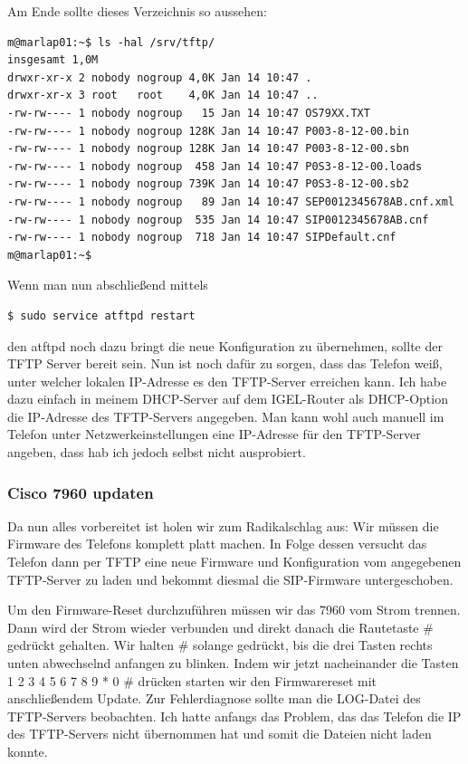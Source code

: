 \documentclass[a4paper,12pt]{scrbook}
\begin{document}
Am Ende sollte dieses Verzeichnis so aussehen:

\begin{lstlisting}
m@marlap01:~$ ls -hal /srv/tftp/
insgesamt 1,0M
drwxr-xr-x 2 nobody nogroup 4,0K Jan 14 10:47 .
drwxr-xr-x 3 root   root    4,0K Jan 14 10:47 ..
-rw-rw---- 1 nobody nogroup   15 Jan 14 10:47 OS79XX.TXT
-rw-rw---- 1 nobody nogroup 128K Jan 14 10:47 P003-8-12-00.bin
-rw-rw---- 1 nobody nogroup 128K Jan 14 10:47 P003-8-12-00.sbn
-rw-rw---- 1 nobody nogroup  458 Jan 14 10:47 P0S3-8-12-00.loads
-rw-rw---- 1 nobody nogroup 739K Jan 14 10:47 P0S3-8-12-00.sb2
-rw-rw---- 1 nobody nogroup   89 Jan 14 10:47 SEP0012345678AB.cnf.xml
-rw-rw---- 1 nobody nogroup  535 Jan 14 10:47 SIP0012345678AB.cnf
-rw-rw---- 1 nobody nogroup  718 Jan 14 10:47 SIPDefault.cnf
m@marlap01:~$ 
\end{lstlisting}
Wenn man nun abschließend mittels

\begin{lstlisting}
$ sudo service atftpd restart
\end{lstlisting}

den atftpd noch dazu bringt die neue Konfiguration zu übernehmen, sollte der TFTP Server bereit sein. Nun ist noch dafür zu sorgen,
dass das Telefon weiß, unter welcher lokalen IP-Adresse es den TFTP-Server erreichen kann. Ich habe dazu einfach in meinem DHCP-Server
auf dem IGEL-Router als DHCP-Option die IP-Adresse des TFTP-Servers angegeben. Man kann wohl auch manuell im Telefon unter Netzwerkeinstellungen
eine IP-Adresse für den TFTP-Server angeben, dass hab ich jedoch selbst nicht ausprobiert.

\subsubsection{Cisco 7960 updaten}
Da nun alles vorbereitet ist holen wir zum Radikalschlag aus: Wir müssen die Firmware des Telefons komplett platt machen. In Folge dessen versucht das
Telefon dann per TFTP eine neue Firmware und Konfiguration vom angegebenen TFTP-Server zu laden und bekommt diesmal die SIP-Firmware untergeschoben.

Um den Firmware-Reset durchzuführen müssen wir das 7960 vom Strom trennen. Dann wird der Strom wieder verbunden und direkt danach die Rautetaste \# gedrückt gehalten.
Wir halten \# solange gedrückt, bis die drei Tasten rechts unten abwechselnd anfangen zu blinken. Indem wir jetzt nacheinander die Tasten 1 2 3 4 5 6 7 8 9 * 0 \# drücken starten wir den
Firmwarereset mit anschließendem Update. Zur Fehlerdiagnose sollte man die LOG-Datei des TFTP-Servers beobachten. Ich hatte anfangs das Problem, das das Telefon die IP des TFTP-Servers
nicht übernommen hat und somit die Dateien nicht laden konnte. 
\end{document}
